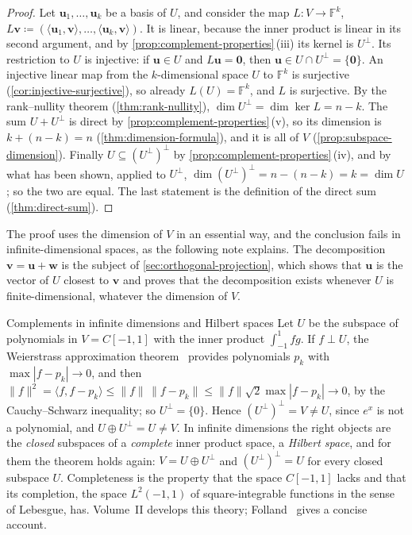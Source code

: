 \begin{proof}
Let $\mathbf u_1,\ldots,\mathbf u_k$ be a basis of $U$, and consider the map $L\colon V\to\mathbb F^k$, $L\mathbf v\coloneqq(\langle\mathbf u_1,\mathbf v\rangle,\ldots,\langle\mathbf u_k,\mathbf v\rangle)$. It is linear, because the inner product is linear in its second argument, and by \cref{prop:complement-properties}\,(iii) its kernel is $U^\perp$. Its restriction to $U$ is injective: if $\mathbf u\in U$ and $L\mathbf u=\mathbf 0$, then $\mathbf u\in U\cap U^\perp=\{\mathbf 0\}$. An injective linear map from the $k$-dimensional space $U$ to $\mathbb F^k$ is surjective (\cref{cor:injective-surjective}), so already $L(U)=\mathbb F^k$, and $L$ is surjective. By the rank--nullity theorem (\cref{thm:rank-nullity}), $\dim U^\perp=\dim\ker L=n-k$. The sum $U+U^\perp$ is direct by \cref{prop:complement-properties}\,(v), so its dimension is $k+(n-k)=n$ (\cref{thm:dimension-formula}), and it is all of $V$ (\cref{prop:subspace-dimension}). Finally $U\subseteq(U^\perp)^\perp$ by \cref{prop:complement-properties}\,(iv), and by what has been shown, applied to $U^\perp$, $\dim(U^\perp)^\perp=n-(n-k)=k=\dim U$; so the two are equal. The last statement is the definition of the direct sum (\cref{thm:direct-sum}).
\end{proof}

The proof uses the dimension of $V$ in an essential way, and the conclusion fails in infinite-dimensional spaces, as the following note explains. The decomposition $\mathbf v=\mathbf u+\mathbf w$ is the subject of \cref{sec:orthogonal-projection}, which shows that $\mathbf u$ is the vector of $U$ closest to $\mathbf v$ and proves that the decomposition exists whenever $U$ is finite-dimensional, whatever the dimension of $V$.

\begin{note}{Complements in infinite dimensions and Hilbert spaces}
Let $U$ be the subspace of polynomials in $V=C[-1,1]$ with the inner product $\int_{-1}^1fg$. If $f\perp U$, the Weierstrass approximation theorem~\cite[Thm.~7.26]{rudin1976} provides polynomials $p_k$ with $\max|f-p_k|\to0$, and then $\|f\|^2=\langle f,f-p_k\rangle\le\|f\|\,\|f-p_k\|\le\|f\|\sqrt2\max|f-p_k|\to0$, by the Cauchy--Schwarz inequality; so $U^\perp=\{0\}$. Hence $(U^\perp)^\perp=V\ne U$, since $e^x$ is not a polynomial, and $U\oplus U^\perp=U\ne V$. In infinite dimensions the right objects are the \emph{closed} subspaces of a \emph{complete} inner product space, a \emph{Hilbert space}, and for them the theorem holds again: $V=U\oplus U^\perp$ and $(U^\perp)^\perp=U$ for every closed subspace $U$. Completeness is the property that the space $C[-1,1]$ lacks and that its completion, the space $L^2(-1,1)$ of square-integrable functions in the sense of Lebesgue, has. Volume~II develops this theory; Folland~\cite[Sect.~5.5]{folland1999} gives a concise account.
\end{note}

